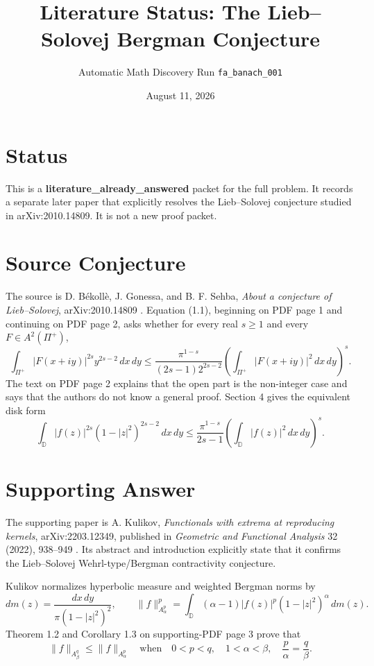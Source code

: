 \documentclass[11pt]{article}
\title{Literature Status: The Lieb--Solovej Bergman Conjecture}
\author{Automatic Math Discovery Run \texttt{fa\_banach\_001}}
\date{August 11, 2026}
\begin{document}
\maketitle

\section*{Status}

This is a \textbf{literature\_already\_answered} packet for the full
problem. It records a separate later paper that explicitly resolves the
Lieb--Solovej conjecture studied in arXiv:2010.14809. It is not a new proof
packet.

\section*{Source Conjecture}

The source is D. B\'ekoll\`e, J. Gonessa, and B. F. Sehba,
\emph{About a conjecture of Lieb--Solovej}, arXiv:2010.14809
\cite{BGS}. Equation (1.1), beginning on PDF page 1 and continuing on PDF
page 2, asks whether for every real $s\geq 1$ and every
$F\in A^2(\Pi^+)$,
\begin{equation}
 \int_{\Pi^+}|F(x+iy)|^{2s}y^{2s-2}\,dx\,dy
 \leq
 \frac{\pi^{1-s}}{(2s-1)2^{2s-2}}
 \left(\int_{\Pi^+}|F(x+iy)|^2\,dx\,dy\right)^s.
 \label{eq:source}
\end{equation}
The text on PDF page 2 explains that the open part is the non-integer case and
says that the authors do not know a general proof. Section 4 gives the
equivalent disk form
\begin{equation}
 \int_{\mathbb D}|f(z)|^{2s}(1-|z|^2)^{2s-2}\,dx\,dy
 \leq \frac{\pi^{1-s}}{2s-1}
 \left(\int_{\mathbb D}|f(z)|^2\,dx\,dy\right)^s.
 \label{eq:disk}
\end{equation}

\section*{Supporting Answer}

The supporting paper is A. Kulikov, \emph{Functionals with extrema at
reproducing kernels}, arXiv:2203.12349, published in \emph{Geometric and
Functional Analysis} 32 (2022), 938--949 \cite{Kulikov}. Its abstract and
introduction explicitly state that it confirms the Lieb--Solovej
Wehrl-type/Bergman contractivity conjecture.

Kulikov normalizes hyperbolic measure and weighted Bergman norms by
\[
 dm(z)=\frac{dx\,dy}{\pi(1-|z|^2)^2},\qquad
 \|f\|_{A^p_\alpha}^p
 =\int_{\mathbb D}(\alpha-1)|f(z)|^p(1-|z|^2)^\alpha\,dm(z).
\]
Theorem 1.2 and Corollary 1.3 on supporting-PDF page 3 prove that
\[
 \|f\|_{A^q_\beta}\leq \|f\|_{A^p_\alpha}
 \quad\text{when}\quad
 0<p<q,\quad 1<\alpha<\beta,\quad \frac p\alpha=\frac q\beta.
\]
\end{document}
